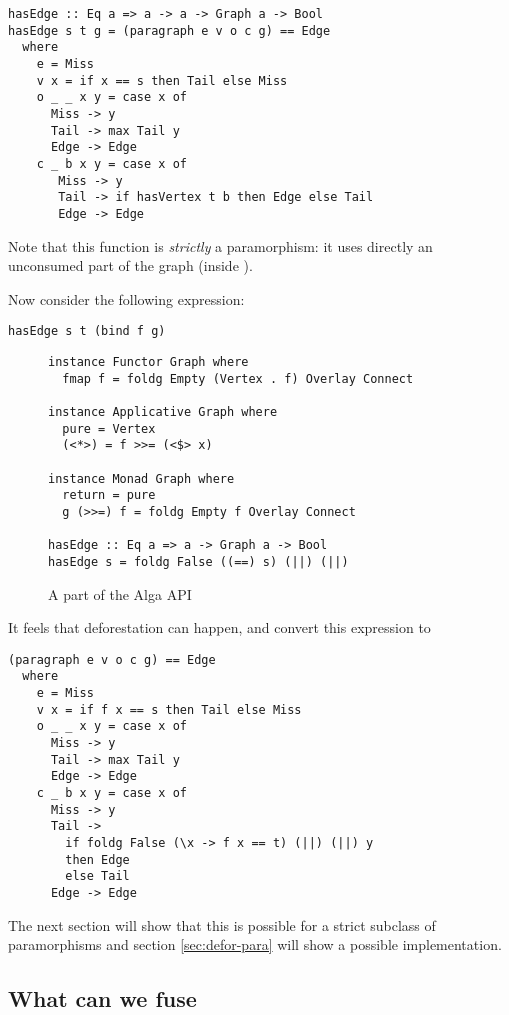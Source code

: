 \begin{verbatim}
hasEdge :: Eq a => a -> a -> Graph a -> Bool
hasEdge s t g = (paragraph e v o c g) == Edge
  where
    e = Miss
    v x = if x == s then Tail else Miss
    o _ _ x y = case x of
      Miss -> y
      Tail -> max Tail y
      Edge -> Edge
    c _ b x y = case x of
       Miss -> y
       Tail -> if hasVertex t b then Edge else Tail
       Edge -> Edge
\end{verbatim}

Note that this function is \emph{strictly} a paramorphism: it uses directly an unconsumed part of the graph (inside ).

Now consider the following expression:
\begin{verbatim}
hasEdge s t (bind f g)
\end{verbatim}

\begin{figure*}
\begin{verbatim}
instance Functor Graph where
  fmap f = foldg Empty (Vertex . f) Overlay Connect

instance Applicative Graph where
  pure = Vertex
  (<*>) = f >>= (<$> x)

instance Monad Graph where
  return = pure
  g (>>=) f = foldg Empty f Overlay Connect
  
hasEdge :: Eq a => a -> Graph a -> Bool
hasEdge s = foldg False ((==) s) (||) (||)
\end{verbatim}
\caption{A part of the Alga API}
\end{figure*}

It feels that deforestation can happen, and convert this expression to
\begin{verbatim}
(paragraph e v o c g) == Edge
  where
    e = Miss
    v x = if f x == s then Tail else Miss
    o _ _ x y = case x of
      Miss -> y
      Tail -> max Tail y
      Edge -> Edge
    c _ b x y = case x of
      Miss -> y
      Tail ->
        if foldg False (\x -> f x == t) (||) (||) y
        then Edge
        else Tail
      Edge -> Edge
\end{verbatim}

The next section will show that this is possible for a strict subclass of paramorphisms and section \ref{sec:defor-para} will show a possible implementation.

\subsection{What can we fuse}

